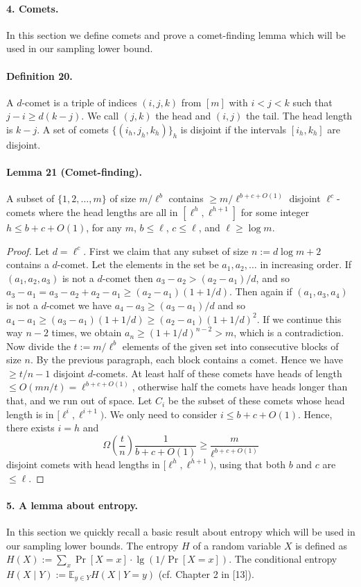 \documentclass[10pt,a4paper]{article}
\begin{document}
\paragraph{4. Comets.}
In this section we define comets and prove a comet-finding lemma which will be used in our sampling lower bound.
\paragraph{Definition 20.}
A $d$-comet is a triple of indices $(i,j,k)$ from $[m]$ with $i<j<k$ such that $j-i\geq d(k-j)$. We call $(j,k)$ the head and $(i,j)$ the tail. The head length is $k-j$. A set of comets $\{(i_h,j_h,k_h)\}_h$ is disjoint if the intervals $[i_h,k_h]$ are disjoint.
\paragraph{Lemma 21 (Comet-finding).}
A subset of $\{1,2,\ldots,m\}$ of size $m/\ell^b$ contains $\geq m/\ell^{b+c+O(1)}$ disjoint $\ell^c$-comets where the head lengths are all in $[\ell^h,\ell^{h+1}]$ for some integer $h\leq b+c+O(1)$, for any $m$, $b\leq\ell$, $c\leq\ell$, and $\ell\geq\log m$.
\begin{proof}
Let $d=\ell^c$. First we claim that any subset of size $n:=d\log m+2$ contains a $d$-comet. Let the elements in the set be $a_1,a_2,\ldots$ in increasing order. If $(a_1,a_2,a_3)$ is not a $d$-comet then $a_3-a_2>(a_2-a_1)/d$, and so $a_3-a_1=a_3-a_2+a_2-a_1\geq(a_2-a_1)(1+1/d)$. Then again if $(a_1,a_3,a_4)$ is not a $d$-comet we have $a_4-a_3\geq(a_3-a_1)/d$ and so $a_4-a_1\geq(a_3-a_1)(1+1/d)\geq(a_2-a_1)(1+1/d)^2$. If we continue this way $n-2$ times, we obtain $a_n\geq(1+1/d)^{n-2}>m$, which is a contradiction.
Now divide the $t:=m/\ell^b$ elements of the given set into consecutive blocks of size $n$. By the previous paragraph, each block contains a comet. Hence we have $\geq t/n-1$ disjoint $d$-comets.
At least half of these comets have heads of length $\leq O(mn/t)=\ell^{b+c+O(1)}$, otherwise half the comets have heads longer than that, and we run out of space. Let $C_i$ be the subset of these comets whose head length is in $[\ell^i,\ell^{i+1})$. We only need to consider $i\leq b+c+O(1)$. Hence, there exists $i=h$ and
\[\Omega\left(\frac tn\right)\frac1{b+c+O(1)}\geq\frac m{\ell^{b+c+O(1)}}\]
disjoint comets with head lengths in $[\ell^h,\ell^{h+1})$, using that both $b$ and $c$ are $\leq\ell$.
\end{proof}
\paragraph{5. A lemma about entropy.}
In this section we quickly recall a basic result about entropy which will be used in our sampling lower bounds. The entropy $H$ of a random variable $X$ is defined as $H(X):=\sum_x\Pr[X=x]\cdot\lg(1/\Pr[X=x])$. The conditional entropy $H(X\mid Y):=\mathbb E_{y\in Y}H(X\mid Y=y)$ (cf. Chapter 2 in [13]).
\end{document}
